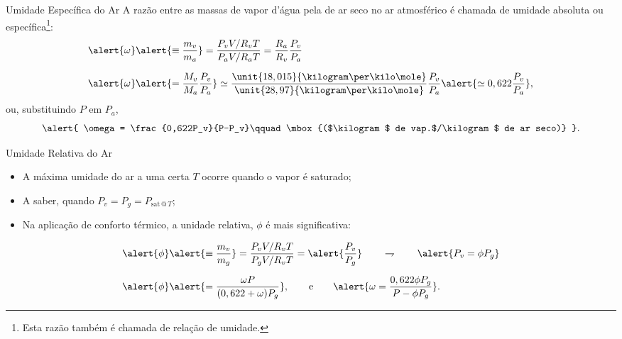     \begin{frame}{Umidade Específica do Ar}\vspace*{-0em}
        A razão entre as massas de vapor d'água pela de ar seco no ar atmosférico é chamada de
        \alert{umidade absoluta} ou \alert{específica}\footnote{Esta razão também é chamada de
        \alert{relação de umidade}.}:
        \begin{align*}
            \alert{\omega} &
            \alert{\equiv\frac{m_v}{m_a}}
            = \frac{P_vV/R_vT}{P_aV/R_aT} = \frac{R_a}{R_v}\frac{P_v}{P_a}
            \\[\medskipamount]
            \alert{\omega} &
            \alert{= \frac{M_v}{M_a}\frac{P_v}{P_a}}
            \simeq
            \frac{\unit{18,015}{\kilogram\per\kilo\mole}}{\unit{28,97}{\kilogram\per\kilo\mole}}
            \frac{P_v}{P_a}
            \alert{\simeq 0,622\frac{P_v}{P_a}},
        \end{align*}
        ou, substituindo $P$ em $P_a$,
        \begin{equation*}
            \alert{
                \omega = \frac{0,622P_v}{P-P_v}\qquad
                \mbox{($\kilogram$ de vap.$/\kilogram$ de ar seco)}
            }.
        \end{equation*}
    \end{frame}

    \begin{frame}{Umidade Relativa do Ar}\vspace*{-0em}
        \begin{itemize}
            \item<1-> A máxima umidade do ar a uma certa $T$ ocorre quando o vapor é
                \alert{saturado};
            \item<1-> A saber, quando \alert{$P_v = P_g = P_{\mathrm{sat}\,@\,T}$};
            \item<1-> Na aplicação de \alert{conforto térmico}, a \alert{unidade relativa},
                \alert{$\phi$} é mais significativa:
        \end{itemize}
        \begin{align*}
            \alert{\phi} &
            \alert{\equiv \frac{m_v}{m_g}}
            =\frac{P_vV/R_vT}{P_gV/R_vT} = \alert{\frac{P_v}{P_g}}
            \qquad\rightharpoondown\qquad
            \alert{P_v = \phi P_g}
            \\[\medskipamount]
            \alert{\phi} &
            \alert{=\frac{\omega P}{(0,622+\omega)P_g}},
            \qquad\mbox{e}\qquad
            \alert{\omega=\frac{0,622\phi P_g}{P-\phi P_g}}.
        \end{align*}
    \end{frame}

